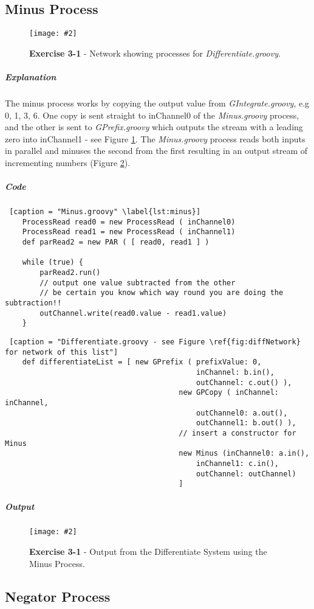 \documentclass[10pt, a4paper]{article}
\newcommand{\figuremacro}[5]{
    \begin{figure}[#1]
        \centering
        \texttt{[image: \#2]}
        \caption[#3]{\textbf{#3}#4}
        \label{fig:#2}
    \end{figure}
}
\begin{document}
	\subsection*{Minus Process} \hfill
	
	\figuremacro{H}{diffNetwork}{Exercise 3-1}{ - Network showing processes for \textit{Differentiate.groovy}.}{1.0}
	
	\subparagraph{Explanation} The minus process works by copying the output value from \textit{GIntegrate.groovy}, e.g 0, 1, 3, 6. One copy is sent straight to inChannel0 of the \textit{Minus.groovy} process, and the other is sent to \textit{GPrefix.groovy} which outputs the stream with a leading zero into inChannel1 - see Figure \ref{fig:diffNetwork}. The \textit{Minus.groovy} process reads both inputs in parallel and minuses the second from the first resulting in an output stream of incrementing numbers (Figure \ref{fig:output3-1minus}).
	
	\subparagraph{Code} \hfill
	
	\begin{lstlisting} [caption = "Minus.groovy" \label{lst:minus}]
    ProcessRead read0 = new ProcessRead ( inChannel0)
	ProcessRead read1 = new ProcessRead ( inChannel1)
	def parRead2 = new PAR ( [ read0, read1 ] )
		
	while (true) {
		parRead2.run()
		// output one value subtracted from the other
		// be certain you know which way round you are doing the subtraction!!
		outChannel.write(read0.value - read1.value)
	} \end{lstlisting}
	
	\begin{lstlisting} [caption = "Differentiate.groovy - see Figure \ref{fig:diffNetwork} for network of this list"]
	def differentiateList = [ new GPrefix ( prefixValue: 0, 
											inChannel: b.in(), 
											outChannel: c.out() ),
										new GPCopy ( inChannel: inChannel,  
											outChannel0: a.out(), 
											outChannel1: b.out() ),
										// insert a constructor for Minus    
										new Minus (inChannel0: a.in(),
											inChannel1: c.in(),
											outChannel: outChannel)
										] \end{lstlisting}
	
	\subparagraph{Output} \hfill
	
	\figuremacro{H}{output3-1minus}{Exercise 3-1}{ - Output from the Differentiate System using the Minus Process.}{0.2}
	
	\subsection*{Negator Process}
	
\end{document}
